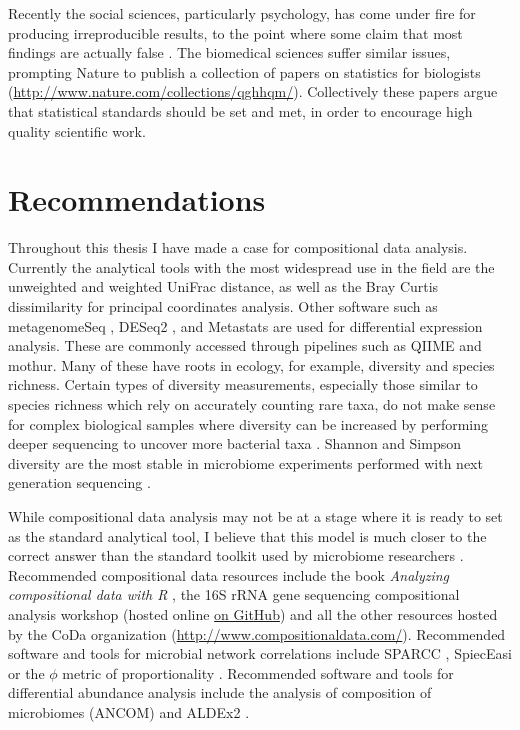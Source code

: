 Recently the social sciences, particularly psychology, has come under fire for producing irreproducible results, to the point where some claim that most findings are actually false \cite{ioannidis2005most}. The biomedical sciences suffer similar issues, prompting Nature to publish a collection of papers on statistics for biologists (\url{http://www.nature.com/collections/qghhqm/}). Collectively these papers argue that statistical standards should be set and met, in order to encourage high quality scientific work.

\section{Recommendations}
Throughout this thesis I have made a case for compositional data analysis. Currently the analytical tools with the most widespread use in the field are the unweighted and weighted UniFrac distance, as well as the Bray Curtis dissimilarity for principal coordinates analysis. Other software such as metagenomeSeq \cite{paulson2014metagenomeseq}, DESeq2 \cite{love2014moderated}, and Metastats \cite{paulson2011metastats} are used for differential expression analysis. These are commonly accessed through pipelines such as QIIME and mothur. Many of these have roots in ecology, for example, diversity and species richness. Certain types of diversity measurements, especially those similar to species richness which rely on accurately counting rare taxa, do not make sense for complex biological samples where diversity can be increased by performing deeper sequencing to uncover more bacterial taxa \cite{haegeman2013robust}. Shannon and Simpson diversity are the most stable in microbiome experiments performed with next generation sequencing \cite{haegeman2013robust}.

While compositional data analysis may not be at a stage where it is ready to set as the standard analytical tool, I believe that this model is much closer to the correct answer than the standard toolkit used by microbiome researchers \cite{gloor2016s} \cite{gloor2016compositional} \cite{fernandes2013anova} \cite{fernandes2014unifying}. Recommended compositional data resources include the book \textit{Analyzing compositional data with R} \cite{van2013analyzing}, the 16S rRNA gene sequencing compositional analysis workshop (hosted online \href{https://github.com/ggloor/compositions/blob/master/background_reading/CJM_supplement/workshop.pdf}{on GitHub}) and all the other resources hosted by the CoDa organization (\url{http://www.compositionaldata.com/}). Recommended software and tools for microbial network correlations include SPARCC \cite{friedman2012inferring}, SpiecEasi \cite{kurtz2015sparse} or the $\phi$ metric of proportionality \cite{lovell2015proportionality}. Recommended software and tools for differential abundance analysis include the analysis of composition of microbiomes (ANCOM) \cite{mandal2015analysis} and ALDEx2 \cite{fernandes2014unifying}.

